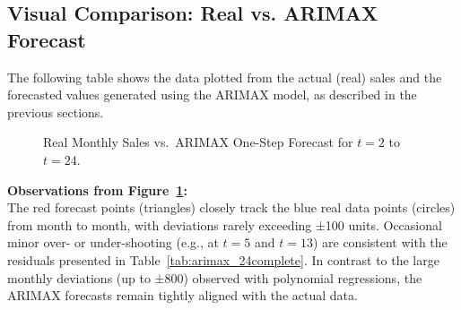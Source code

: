 \documentclass[10pt]{article}
\begin{document}
\subsection{Visual Comparison: Real vs. ARIMAX Forecast}
The following table shows the data plotted from the actual (real) sales and the forecasted values generated using the ARIMAX model, as described in the previous sections.
\begin{figure}[H]
\centering
{}
\caption{Real Monthly Sales vs.\ ARIMAX One-Step Forecast for \(t=2\) to \(t=24\).}
\label{fig:arimax_graph}
\end{figure}

\textbf{Observations from Figure~\ref{fig:arimax_graph}:}\\
The red forecast points (triangles) closely track the blue real data points (circles) from month to month, with deviations rarely exceeding ±100 units. Occasional minor over- or under-shooting (e.g., at \(t=5\) and \(t=13\)) are consistent with the residuals presented in Table~\ref{tab:arimax_24complete}. In contrast to the large monthly deviations (up to ±800) observed with polynomial regressions, the ARIMAX forecasts remain tightly aligned with the actual data.
\end{document}
